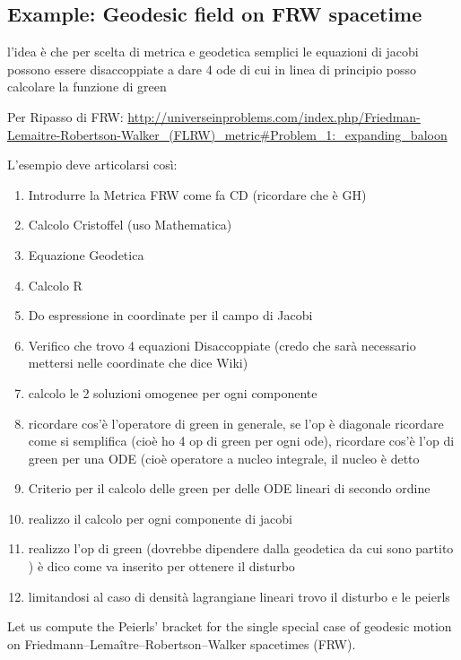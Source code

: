 \documentclass[Main]{subfiles}
\begin{document}
\subsection{Example: Geodesic field on FRW spacetime}
\ifToninus
	\begin{Warning}
	l'idea è che per scelta di metrica e geodetica semplici le equazioni di jacobi possono essere disaccoppiate a dare 4 ode di cui in linea di principio posso calcolare la funzione di green	

	\vspace{2mm}
	Per Ripasso di FRW: \url{http://universeinproblems.com/index.php/Friedman-Lemaitre-Robertson-Walker_(FLRW)_metric#Problem_1:_expanding_baloon}

	\vspace{2mm}
	L'esempio deve articolarsi così:
		\begin{enumerate}
			\item Introdurre la Metrica FRW come fa CD (ricordare che è GH)
			\item Calcolo Cristoffel (uso Mathematica)
			\item Equazione Geodetica
			\item Calcolo R
			\item Do espressione in coordinate per il campo di Jacobi
			\item Verifico che trovo 4 equazioni Disaccoppiate (credo che sarà necessario mettersi nelle coordinate che dice Wiki)
			\item calcolo le 2 soluzioni omogenee per ogni componente
			\item ricordare cos'è l'operatore di green in generale, se l'op è diagonale ricordare come si semplifica (cioè ho 4 op di green per ogni ode), ricordare cos'è l'op di green per una ODE (cioè operatore  a nucleo integrale, il nucleo è detto 
			\item Criterio per il calcolo delle green per delle ODE lineari di secondo ordine
			\item realizzo il calcolo per ogni componente di jacobi
			\item realizzo l'op di green (dovrebbe dipendere dalla geodetica da cui sono partito ) è dico come va inserito per ottenere il disturbo
			\item limitandosi al caso di densità lagrangiane lineari trovo il disturbo e le peierls
		\end{enumerate}
	\end{Warning}
\fi	
	Let us compute the Peierls' bracket for the single special case of geodesic motion on Friedmann–Lemaître–Robertson–Walker spacetimes (FRW).
	
\end{document}
